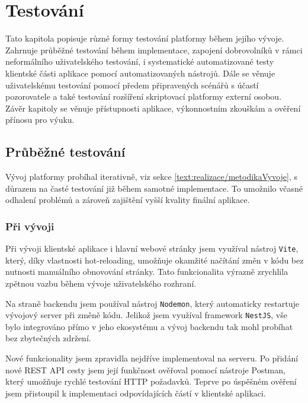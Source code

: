 \chapter{Testování}\label{text:testovani}

\begin{chapterabstract}
Tato kapitola popisuje různé formy testování platformy během jejího vývoje. 
Zahrnuje průběžné testování během implementace, zapojení dobrovolníků v rámci neformálního uživatelského testování, i systematické automatizované testy klientské části aplikace pomocí automatizovaných nástrojů. 
Dále se věnuje uživatelskému testování pomocí předem připravených scénářů s účastí pozorovatele a také testování rozšíření skriptovací platformy externí osobou. 
Závěr kapitoly se věnuje přístupnosti aplikace, výkonnostním zkouškám a ověření přínosu pro výuku.
\end{chapterabstract}

\section{Průběžné testování}\label{text:testovani/prubezne}

Vývoj platformy probíhal iterativně, viz sekce \ref{text:realizace/metodikaVyvoje}, s důrazem na časté testování již během samotné implementace.
To umožnilo včasné odhalení problémů a zároveň zajištění vyšší kvality finální aplikace.

\subsection{Při vývoji}

Při vývoji klientské aplikace i hlavní webové stránky jsem využíval nástroj \texttt{Vite}, který, díky vlastnosti hot-reloading, umožňuje okamžité načítání změn v kódu bez nutnosti manuálního obnovování stránky.
Tato funkcionalita výrazně zrychlila zpětnou vazbu během vývoje uživatelského rozhraní.

Na straně backendu jsem používal nástroj \texttt{Nodemon}, který automaticky restartuje vývojový server při změně kódu. 
Jelikož jsem využíval framework \texttt{NestJS}, vše bylo integrováno přímo v jeho ekosystému a vývoj backendu tak mohl probíhat bez zbytečných zdržení.

Nové funkcionality jsem zpravidla nejdříve implementoval na serveru.
Po přidání nové REST API cesty jsem její funkčnost ověřoval pomocí nástroje Postman, který umožňuje rychlé testování HTTP požadavků.
Teprve po úspěšném ověření jsem přistoupil k implementaci odpovídajících částí v klientské aplikaci.

